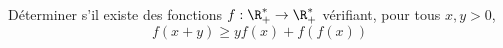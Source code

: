 Déterminer s'il existe des fonctions $f : \R_+^*\rightarrow \R_+^*$ vérifiant, pour tous $x, y> 0$,
$$f(x + y)\ge yf(x) + f(f(x))$$